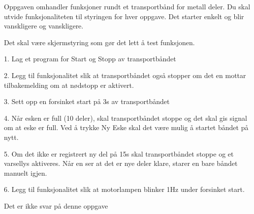 


Oppgaven omhandler funksjoner rundt et transportbånd for metall deler.
Du skal utvide funksjonaliteten til styringen for hver oppgave. Det
starter enkelt og blir vanskligere og vanskligere. 


Det skal være skjermstyring som gør det lett å test funksjonen. 

1. Lag et program for Start og Stopp av transportbåndet 

2. Legg til funksjonalitet slik at transportbåndet også stopper om
det en mottar tilbakemelding om at nødstopp er aktivert. 

3. Sett opp en forsinket start på 3s av transportbåndet 

4. Når esken er full (10 deler), skal transportbåndet stoppe og det
skal gis signal om at eske er full. Ved å trykke Ny Eske skal det
være mulig å startet båndet på nytt. 

5. Om det ikke er registrert ny del på 15s skal transportbåndet stoppe
og et varsellys aktiveres. Når en ser at det er nye deler klare, starer
en bare båndet manuelt igjen. 

6. Legg til funksjonalitet slik at motorlampen blinker 1Hz under forsinket
start. 






Det er ikke svar på denne oppgave












